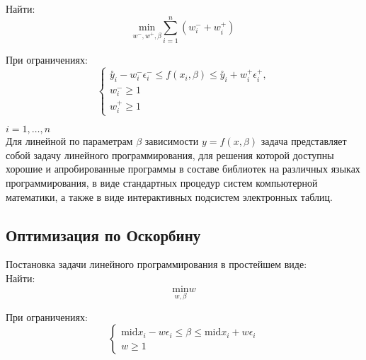 Найти: \\

\begin{equation}
	\underset {w^{-}, w^{+}, \beta}{\text{min}} \sum\limits_{i=1}^{n} (w_i^{-} + w_i^{+})
\end{equation}

При ограничениях: \\

\begin{equation}
	\begin{cases}
		\stackrel{\circ}{y}_i - w_i^{-} \epsilon_i^{-} \leq f(x_i,\beta) \leq \stackrel{\circ}{y}_i + w_i^{+} \epsilon_i^{+}, \\
		w_i^{-} \geq 1 \\
		w_i^{+} \geq 1 
	\end{cases}
\end{equation}

$i = 1, \ldots, n$ \\

Для линейной по параметрам $\beta$ зависимости $y = f(x, \beta)$ задача представляет собой задачу линейного программирования, для решения которой доступны хорошие и апробированные программы в составе библиотек на различных языках программирования, в виде стандартных процедур систем компьютерной математики, а также в виде интерактивных подсистем электронных таблиц. 

\subsection{Оптимизация по Оскорбину}

Постановка задачи линейного программирования в простейшем виде: \\

Найти: \\

\begin{equation}
	\underset {w, \beta}{\text{min}} w
\end{equation}

При ограничениях: \\

\begin{equation}
	\begin{cases}
		\text{mid} x_i - w \epsilon_i \leq \beta \leq \text{mid} x_i + w \epsilon_i\\
		w \geq 1 
	\end{cases}
\end{equation}

